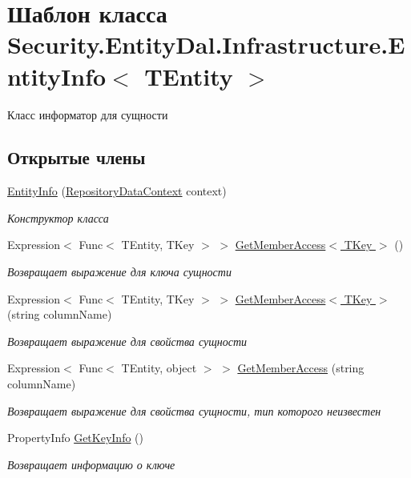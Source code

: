 \hypertarget{class_security_1_1_entity_dal_1_1_infrastructure_1_1_entity_info}{}\section{Шаблон класса Security.\+Entity\+Dal.\+Infrastructure.\+Entity\+Info$<$ T\+Entity $>$}
\label{class_security_1_1_entity_dal_1_1_infrastructure_1_1_entity_info}


Класс информатор для сущности  


\subsection*{Открытые члены}
\begin{DoxyCompactItemize}
\item 
\hyperlink{class_security_1_1_entity_dal_1_1_infrastructure_1_1_entity_info_a77aa0e0dbb82cd1a6a2efb9a10700235}{Entity\+Info} (\hyperlink{class_security_1_1_entity_dal_1_1_base_1_1_repository_data_context}{Repository\+Data\+Context} context)
\begin{DoxyCompactList}\small\item\em Конструктор класса \end{DoxyCompactList}\item 
Expression$<$ Func$<$ T\+Entity, T\+Key $>$ $>$ \hyperlink{class_security_1_1_entity_dal_1_1_infrastructure_1_1_entity_info_ae2a059a47208059f58c05d316aef50a9}{Get\+Member\+Access$<$ T\+Key $>$} ()
\begin{DoxyCompactList}\small\item\em Возвращает выражение для ключа сущности \end{DoxyCompactList}\item 
Expression$<$ Func$<$ T\+Entity, T\+Key $>$ $>$ \hyperlink{class_security_1_1_entity_dal_1_1_infrastructure_1_1_entity_info_aaeae67737bdb3fb3a060a72007268ffb}{Get\+Member\+Access$<$ T\+Key $>$} (string column\+Name)
\begin{DoxyCompactList}\small\item\em Возвращает выражение для свойства сущности \end{DoxyCompactList}\item 
Expression$<$ Func$<$ T\+Entity, object $>$ $>$ \hyperlink{class_security_1_1_entity_dal_1_1_infrastructure_1_1_entity_info_a00fbeaff893bc743c782586ae88e5070}{Get\+Member\+Access} (string column\+Name)
\begin{DoxyCompactList}\small\item\em Возвращает выражение для свойства сущности, тип которого неизвестен \end{DoxyCompactList}\item 
Property\+Info \hyperlink{class_security_1_1_entity_dal_1_1_infrastructure_1_1_entity_info_ae3d711d7f937ceca72fb9970fba30677}{Get\+Key\+Info} ()
\begin{DoxyCompactList}\small\item\em Возвращает информацию о ключе \end{DoxyCompactList}\end{DoxyCompactItemize}
